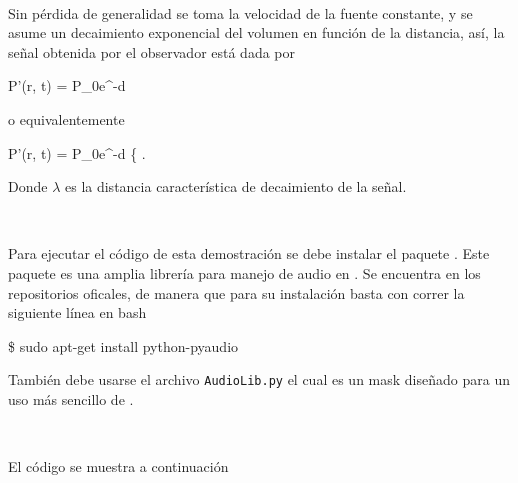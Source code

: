 \

Sin pérdida de generalidad se toma la velocidad de la fuente constante, y
se asume un decaimiento exponencial del volumen en función de la distancia,
así, la señal obtenida por el observador está dada por

{P'(r, t) = P_0e^{-\lambda d} \sin{}}
 
o equivalentemente 

{ P'(r, t) = P_0e^{-\lambda d} 
			 \left\{  \right.}


Donde $\lambda$ es la distancia característica de decaimiento de la señal. 

\

Para ejecutar el código de esta demostración se debe instalar el paquete
\pyaudio. Este paquete es una amplia librería para manejo de audio en 
\python. Se encuentra en los repositorios oficales, de manera que para su 
instalación basta con correr la siguiente línea en bash

\begin{listing}[style=consola, numbers=none]
\$ sudo apt-get install python-pyaudio
\end{listing}

También debe usarse el archivo \texttt{AudioLib.py} el cual es un mask 
diseñado para un uso más sencillo de \pyaudio.

\

El código se muestra a continuación


